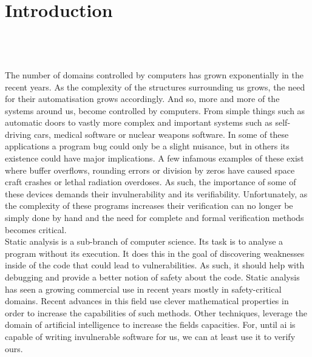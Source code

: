 
\setcounter{chapter}{0}

\chapter{Introduction}
\mbox{}\\
\mbox{}\\
\mbox{}\\
The number of domains controlled by computers has grown exponentially in the recent years. As the complexity of the structures surrounding us grows, the need for their automatisation grows accordingly. And so, more and more of the systems around us, become controlled by computers. From simple things such as automatic doors to vastly more complex and important systems such as self-driving cars, medical software or nuclear weapons software. In some of these applications a program bug could only be a slight nuisance, but in others its existence could have major implications. A few infamous examples of these exist where buffer overflows, rounding errors or division by zeros have caused space craft crashes or lethal radiation overdoses. As such, the importance of some of these devices demands their invulnerability and its verifiability. Unfortunately, as the complexity of these programs increases their verification can no longer be simply done by hand and the need for complete and formal verification methods becomes critical.\\
Static analysis is a sub-branch of computer science. Its task is to analyse a program without its execution. It does this in the goal of discovering weaknesses inside of the code that could lead to vulnerabilities. As such, it should help with debugging and provide a better notion of safety about the code. Static analysis has seen a growing commercial use in recent years mostly in safety-critical domains. Recent advances in this field use clever mathematical properties in order to increase the capabilities of such methods. Other techniques, leverage the domain of artificial intelligence to increase the fields capacities. For, until ai is capable of writing invulnerable software for us, we can at least use it to verify ours.
